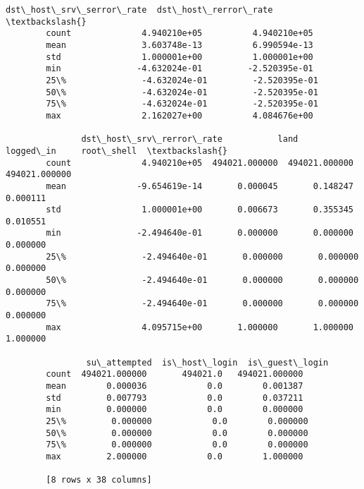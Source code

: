 \documentclass[11pt]{article}
\begin{document}
\begin{Verbatim}[commandchars=\\\{\}]
               dst\_host\_srv\_serror\_rate  dst\_host\_rerror\_rate  \textbackslash{}
        count              4.940210e+05          4.940210e+05   
        mean               3.603748e-13          6.990594e-13   
        std                1.000001e+00          1.000001e+00   
        min               -4.632024e-01         -2.520395e-01   
        25\%               -4.632024e-01         -2.520395e-01   
        50\%               -4.632024e-01         -2.520395e-01   
        75\%               -4.632024e-01         -2.520395e-01   
        max                2.162027e+00          4.084676e+00   
        
               dst\_host\_srv\_rerror\_rate           land      logged\_in     root\_shell  \textbackslash{}
        count              4.940210e+05  494021.000000  494021.000000  494021.000000   
        mean              -9.654619e-14       0.000045       0.148247       0.000111   
        std                1.000001e+00       0.006673       0.355345       0.010551   
        min               -2.494640e-01       0.000000       0.000000       0.000000   
        25\%               -2.494640e-01       0.000000       0.000000       0.000000   
        50\%               -2.494640e-01       0.000000       0.000000       0.000000   
        75\%               -2.494640e-01       0.000000       0.000000       0.000000   
        max                4.095715e+00       1.000000       1.000000       1.000000   
        
                su\_attempted  is\_host\_login  is\_guest\_login  
        count  494021.000000       494021.0   494021.000000  
        mean        0.000036            0.0        0.001387  
        std         0.007793            0.0        0.037211  
        min         0.000000            0.0        0.000000  
        25\%         0.000000            0.0        0.000000  
        50\%         0.000000            0.0        0.000000  
        75\%         0.000000            0.0        0.000000  
        max         2.000000            0.0        1.000000  
        
        [8 rows x 38 columns]
\end{Verbatim}
            
\end{document}
